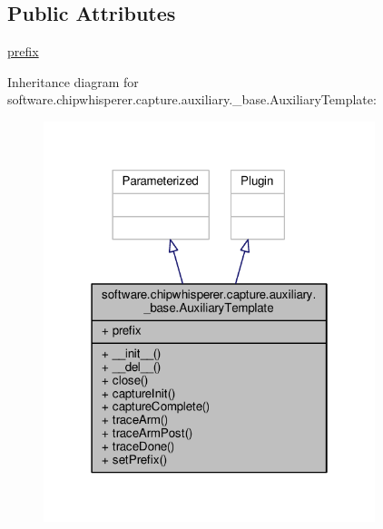 \subsection*{Public Attributes}
\begin{DoxyCompactItemize}
\item 
\hyperlink{classsoftware_1_1chipwhisperer_1_1capture_1_1auxiliary_1_1__base_1_1AuxiliaryTemplate_a6810b1e3125868f572ae5f2b77e4da7e}{prefix}
\end{DoxyCompactItemize}


Inheritance diagram for software.\+chipwhisperer.\+capture.\+auxiliary.\+\_\+base.\+Auxiliary\+Template\+:\nopagebreak
\begin{figure}[H]
\begin{center}
\leavevmode
\includegraphics[width=274pt]{d0/da6/classsoftware_1_1chipwhisperer_1_1capture_1_1auxiliary_1_1__base_1_1AuxiliaryTemplate__inherit__graph}
\end{center}
\end{figure}



